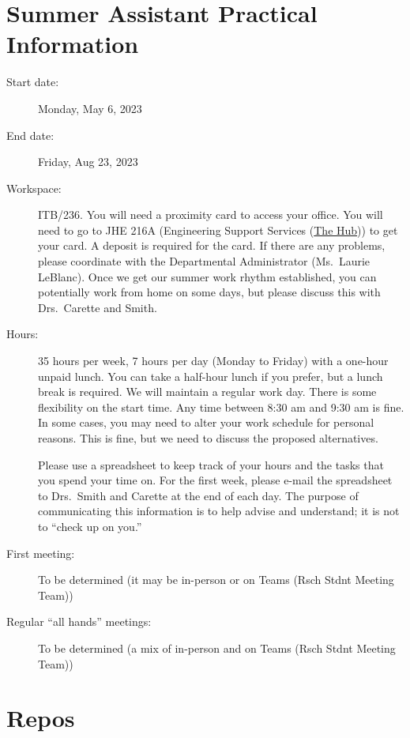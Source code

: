 \documentclass[12pt]{article}
\begin{document}
\section{Summer Assistant Practical Information} \label{SecPractInfo}

\begin{description}

\item [Start date:] Monday, May 6, 2023

\item [End date:] Friday, Aug 23, 2023

\item [Workspace:] ITB/236. You will need a proximity card to access your
office.  You will need to go to JHE 216A (Engineering Support Services
(\href{https://www.eng.mcmaster.ca/engineering-support-services-hub/} {The
Hub})) to get your card.  A deposit is required for the card.  If there are any
problems, please coordinate with the Departmental Administrator (Ms.\ Laurie
LeBlanc).  Once we get our summer work rhythm established, you can potentially
work from home on some days, but please discuss this with Drs.\ Carette and
Smith.

\item [Hours:] 35 hours per week, 7 hours per day (Monday to Friday) with a
one-hour unpaid lunch.  You can take a half-hour lunch if you prefer, but a
lunch break is required. We will maintain a regular work day.  There is some
flexibility on the start time.  Any time between 8:30 am and 9:30 am is fine.
In some cases, you may need to alter your work schedule for personal reasons.
This is fine, but we need to discuss the proposed alternatives.

Please use a spreadsheet to keep track of your hours and the tasks that you
spend your time on.  For the first week, please e-mail the spreadsheet to Drs.\
Smith and Carette at the end of each day.  The purpose of communicating this
information is to help advise and understand; it is not to ``check up on you.''

\item [First meeting:] To be determined (it may be in-person or on Teams (Rsch
Stdnt Meeting Team))

\item [Regular ``all hands'' meetings:] To be determined (a mix of in-person and
on Teams (Rsch Stdnt Meeting Team))

\end{description}

\section {Repos} \label{SecRepos}
\end{document}
